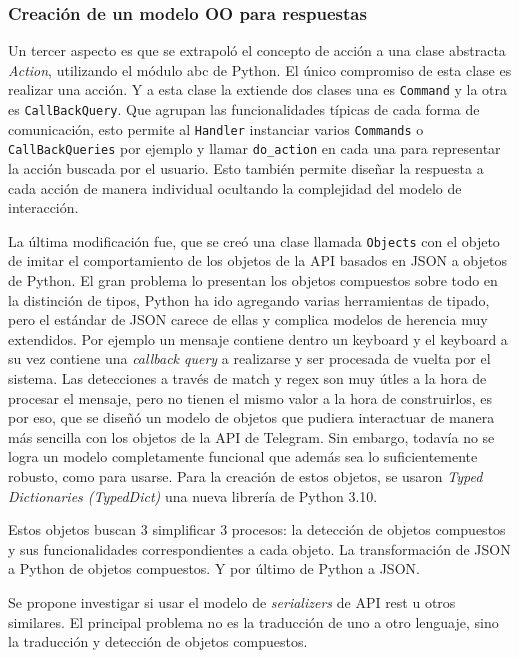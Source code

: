     \subsubsection{Creación de un modelo OO para respuestas}
        \par Un tercer aspecto es que se extrapoló el concepto de acción a una clase abstracta \textit{Action}, utilizando el módulo abc de Python. El único compromiso de esta clase es realizar una acción. Y a esta clase la extiende dos clases una es \texttt{Command} y la otra es \texttt{CallBackQuery}. Que agrupan las funcionalidades típicas de cada forma de comunicación, esto permite al \texttt{Handler} instanciar varios \texttt{Commands} o \texttt{CallBackQueries} por ejemplo y llamar  \texttt{do_action} en cada una para representar la acción buscada por el usuario.
        Esto también permite diseñar la respuesta a cada acción de manera individual ocultando la complejidad del modelo de interacción.


        \par La última modificación fue, que se creó una clase llamada \texttt{Objects} con el objeto de imitar el comportamiento de los objetos de la API basados en JSON a objetos de Python. El gran problema lo presentan los objetos compuestos sobre todo en la distinción de tipos, Python ha ido agregando varias herramientas de tipado, pero el estándar de JSON carece de ellas y complica modelos de herencia muy extendidos. Por ejemplo un mensaje contiene dentro un keyboard y el keyboard a su vez contiene una \textit{callback query} a realizarse y ser procesada de vuelta por el sistema. Las detecciones a través de match y regex son muy útles a la hora de procesar el mensaje, pero no tienen el mismo valor a la hora de construirlos, es por eso, que se diseñó un modelo de objetos que pudiera interactuar de manera más sencilla con los objetos de la API de Telegram. Sin embargo, todavía no se logra un modelo completamente funcional que además sea lo suficientemente robusto, como para usarse. Para la creación de estos objetos, se usaron \textit{Typed Dictionaries (TypedDict)} una nueva librería de Python 3.10.

        \par Estos objetos buscan 3 simplificar 3 procesos: la detección de objetos compuestos y sus funcionalidades correspondientes a cada objeto. La transformación de JSON a Python de objetos compuestos. Y por último de Python a JSON.
        \par Se propone investigar si usar el modelo de \textit{serializers} de API rest u otros similares. El principal problema no es la traducción de uno a otro lenguaje, sino la traducción y detección de objetos compuestos.

